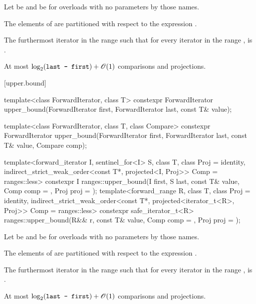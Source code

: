 \begin{itemdescr}
\pnum
Let  be  and
 be 
for overloads with no parameters by those names.

\pnum
\expects
The elements  of 
are partitioned with respect to the expression
.

\pnum
\returns
The furthermost iterator  in the range 
such that for every iterator  in the range ,
 is .

\pnum
\complexity
At most $\log_2(\texttt{last - first}) + \mathscr{O}(1)$ comparisons and projections.
\end{itemdescr}

[upper.bound]{}

%
\begin{itemdecl}
template<class ForwardIterator, class T>
  constexpr ForwardIterator
    upper_bound(ForwardIterator first, ForwardIterator last,
                const T& value);

template<class ForwardIterator, class T, class Compare>
  constexpr ForwardIterator
    upper_bound(ForwardIterator first, ForwardIterator last,
                const T& value, Compare comp);

template<forward_iterator I, sentinel_for<I> S, class T, class Proj = identity,
         indirect_strict_weak_order<const T*, projected<I, Proj>> Comp = ranges::less>
  constexpr I ranges::upper_bound(I first, S last, const T& value, Comp comp = {}, Proj proj = {});
template<forward_range R, class T, class Proj = identity,
         indirect_strict_weak_order<const T*, projected<iterator_t<R>, Proj>> Comp =
           ranges::less>
  constexpr safe_iterator_t<R>
    ranges::upper_bound(R&& r, const T& value, Comp comp = {}, Proj proj = {});
\end{itemdecl}

\begin{itemdescr}
\pnum
Let  be  and
 be 
for overloads with no parameters by those names.

\pnum
\expects
The elements  of 
are partitioned with respect to the expression
.

\pnum
\returns
The furthermost iterator  in the range 
such that for every iterator  in the range ,
 is .

\pnum
\complexity
At most $\log_2(\texttt{last - first}) + \mathscr{O}(1)$ comparisons and projections.
\end{itemdescr}

